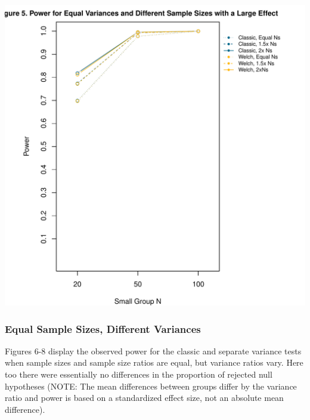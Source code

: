 \documentclass[man]{apa6}\usepackage[]{graphicx}\usepackage[]{color}
\makeatletter
\def\maxwidth{ %
  \ifdim\Gin@nat@width>\linewidth
    \linewidth
  \else
    \Gin@nat@width
  \fi
}
\newenvironment{knitrout}{}{} %
\makeatother
\begin{document}
\begin{knitrout}
\includegraphics[width=\maxwidth]{figure/equal_vars_unequal_Ns_small_d3} 

\end{knitrout}

\subsubsection{Equal Sample Sizes, Different Variances}
Figures 6-8 display the observed power for the classic and separate variance tests when sample sizes and sample size ratios are equal, but variance ratios vary. Here too there were essentially no differences in the proportion of rejected null hypotheses (NOTE: The mean differences between groups differ by the variance ratio and power is based on a standardized effect size, not an absolute mean difference).
\end{document}
